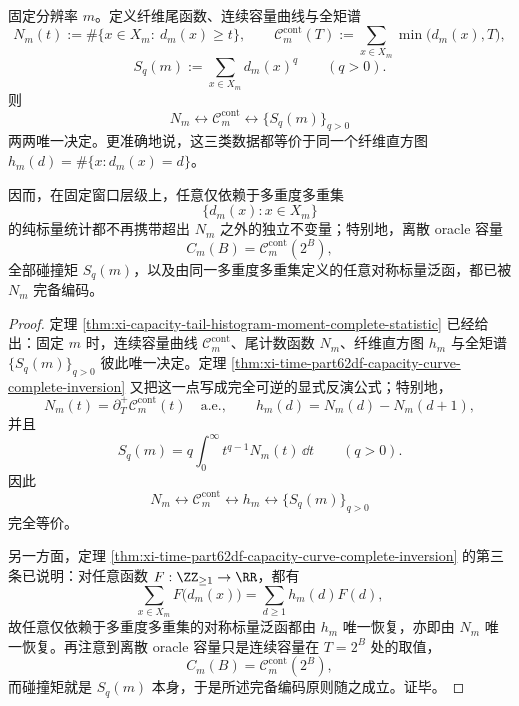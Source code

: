 \begin{theorem}[固定分辨率纤维尾谱的完备统计原则]\label{thm:xi-time-part9xf-tail-spectrum-complete-statistic}
固定分辨率 \(m\)。定义纤维尾函数、连续容量曲线与全矩谱
\[
N_m(t):=\#\{x\in X_m:\ d_m(x)\ge t\},
\qquad
\mathcal C_m^{\mathrm{cont}}(T):=\sum_{x\in X_m}\min\bigl(d_m(x),T\bigr),
\]
\[
S_q(m):=\sum_{x\in X_m}d_m(x)^q
\qquad (q>0).
\]
则
\[
N_m
\longleftrightarrow
\mathcal C_m^{\mathrm{cont}}
\longleftrightarrow
\{S_q(m)\}_{q>0}
\]
两两唯一决定。更准确地说，这三类数据都等价于同一个纤维直方图 \(h_m(d)=\#\{x:d_m(x)=d\}\)。

因而，在固定窗口层级上，任意仅依赖于多重度多重集
\[
\{d_m(x):x\in X_m\}
\]
的纯标量统计都不再携带超出 \(N_m\) 之外的独立不变量；特别地，离散 oracle 容量
\[
C_m(B)=\mathcal C_m^{\mathrm{cont}}(2^B),
\]
全部碰撞矩 \(S_q(m)\)，以及由同一多重度多重集定义的任意对称标量泛函，都已被 \(N_m\) 完备编码。
\end{theorem}
\begin{proof}
定理 \ref{thm:xi-capacity-tail-histogram-moment-complete-statistic} 已经给出：固定 \(m\) 时，连续容量曲线 \(\mathcal C_m^{\mathrm{cont}}\)、尾计数函数 \(N_m\)、纤维直方图 \(h_m\) 与全矩谱 \(\{S_q(m)\}_{q>0}\) 彼此唯一决定。定理 \ref{thm:xi-time-part62df-capacity-curve-complete-inversion} 又把这一点写成完全可逆的显式反演公式；特别地，
\[
N_m(t)=\partial_T^+\mathcal C_m^{\mathrm{cont}}(t)\quad\text{a.e.},
\qquad
h_m(d)=N_m(d)-N_m(d+1),
\]
并且
\[
S_q(m)=q\int_0^\infty t^{q-1}N_m(t)\,\dd t
\qquad (q>0).
\]
因此
\[
N_m
\longleftrightarrow
\mathcal C_m^{\mathrm{cont}}
\longleftrightarrow
h_m
\longleftrightarrow
\{S_q(m)\}_{q>0}
\]
完全等价。

另一方面，定理 \ref{thm:xi-time-part62df-capacity-curve-complete-inversion} 的第三条已说明：对任意函数 \(F:\ZZ_{\ge 1}\to\RR\)，都有
\[
\sum_{x\in X_m}F\bigl(d_m(x)\bigr)
=
\sum_{d\ge 1}h_m(d)F(d),
\]
故任意仅依赖于多重度多重集的对称标量泛函都由 \(h_m\) 唯一恢复，亦即由 \(N_m\) 唯一恢复。再注意到离散 oracle 容量只是连续容量在 \(T=2^B\) 处的取值，
\[
C_m(B)=\mathcal C_m^{\mathrm{cont}}(2^B),
\]
而碰撞矩就是 \(S_q(m)\) 本身，于是所述完备编码原则随之成立。证毕。
\end{proof}

